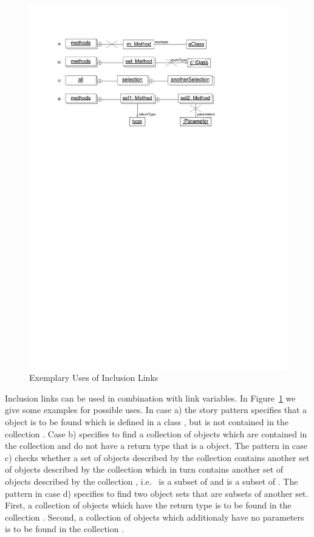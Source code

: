 \begin{figure}[htb]
  \centering
  \includegraphics[scale=0.8]{figures/InclusionLinksExamples}
  \caption{Exemplary Uses of Inclusion Links}
  \label{fig:InlucionLinksExamples}
\end{figure}

Inclusion links can be used in combination with link variables.
In Figure~\ref{fig:InlucionLinksExamples} we give some examples for possible uses.
In case a) the story pattern specifies that a  object is to be found which is defined in a class ,
but is not contained in the collection .
Case b) specifies to find a collection  of  objects which are contained in the collection 
and do not have a return type that is a  object.
The pattern in case c) checks whether a set of objects described by the collection  contains another set of objects described by the collection 
which in turn contains another set of objects described by the collection ,
i.e.\  is a subset of  and  is a subset of .
The pattern in case d) specifies to find two object sets that are subsets of another set.
First, a collection  of  objects which have the return type  is to be found in the collection .
Second, a collection  of  objects which additionaly have no parameters is to be found in the collection .


